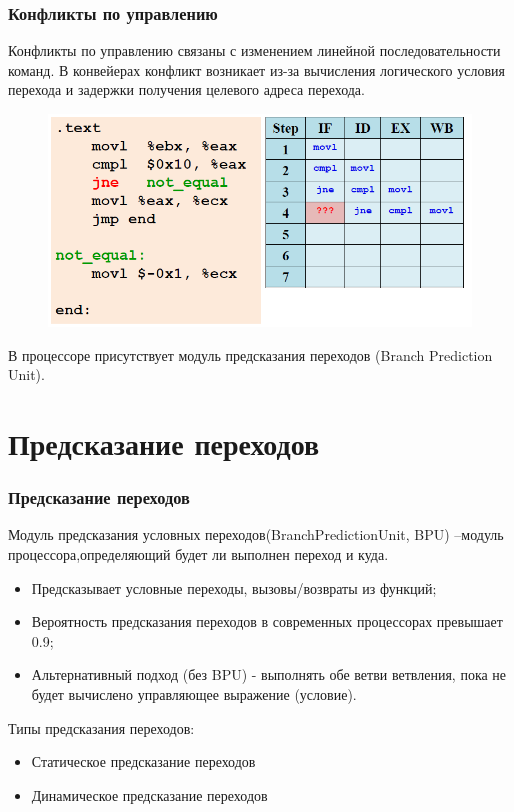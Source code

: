 \documentclass{beamer}
\begin{document}
\begin{frame}
\frametitle{Конфликты по управлению}

Конфликты по управлению связаны с изменением линейной последовательности команд. В конвейерах конфликт возникает из-за вычисления логического условия перехода и задержки получения целевого адреса перехода.

\begin{figure}
\includegraphics[scale=0.4]{Pic_6}
\end{figure}

В процессоре присутствует модуль предсказания переходов (Branch Prediction Unit).

\end{frame}

\section{Предсказание переходов}

\begin{frame}
\frametitle{Предсказание переходов}

Модуль предсказания условных переходов(BranchPredictionUnit, BPU) –модуль процессора,определяющий будет ли выполнен переход и куда.

\begin{itemize}
\item Предсказывает условные переходы, вызовы/возвраты из функций;
\item Вероятность предсказания переходов в современных процессорах превышает 0.9;
\item Альтернативный подход (без BPU) - выполнять обе ветви ветвления, пока не будет вычислено управляющее выражение (условие).
\end{itemize}
Типы предсказания переходов:
\begin{itemize}
\item Статическое предсказание переходов
\item Динамическое предсказание переходов
\end{itemize}
\end{frame}
\end{document}
